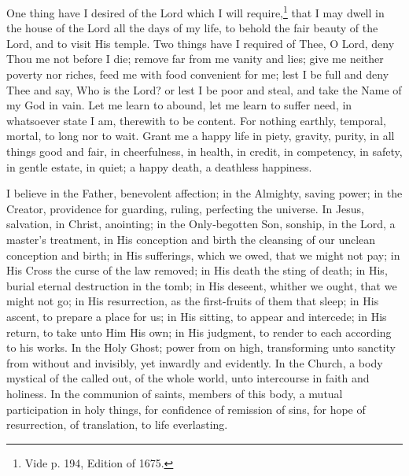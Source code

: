 
One thing have I desired of the Lord which I will require,\footnote{Vide p. 194, Edition of 1675.} that I may dwell in the house of the Lord all the days of my life,  to behold the fair beauty of the Lord, and to visit His temple. Two things have I required of Thee, O Lord, deny Thou me not before I die; remove far from me vanity and lies; give me neither poverty nor riches, feed me with food convenient for me; lest I be full and deny Thee and say, Who is the Lord? or lest I be poor and steal, and take the Name of my God in vain. Let me learn to abound, let me learn to suffer need, in whatsoever state I am, therewith to be content. For nothing earthly, temporal, mortal, to long nor to wait. Grant me a happy life in piety, gravity, purity, in all things good and fair, in cheerfulness, in health, in credit, in competency, in safety, in gentle estate, in quiet; a happy death, a deathless happiness.


I believe in the Father, benevolent affection; in the Almighty, saving power; in the Creator, providence for guarding, ruling, perfecting the universe. In Jesus, salvation, in Christ, anointing; in the Only‑begotten Son, sonship, in the Lord, a master’s treatment, in His conception and birth the cleansing of our unclean conception and birth; in His sufferings, which we owed, that we might not pay; in His Cross the curse of the law removed; in His death the sting of death; in His, burial eternal destruction in the tomb; in His deseent, whither we ought, that we might not go; in His resurrection,  as the first-fruits of them that sleep;  in His ascent, to prepare a place for us; in His sitting, to appear and intercede; in His return, to take unto Him His own; in His judgment, to render to each according to his works. In the Holy Ghost; power from on high, transforming unto sanctity from without and invisibly, yet inwardly and evidently. In the Church, a body mystical of the called out, of the whole world, unto intercourse in faith and holiness. In the communion of saints, members of this body, a mutual participation in holy things, for confidence of remission of sins, for hope of resurrection, of translation, to life everlasting.


